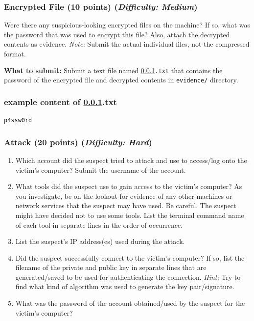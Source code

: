 \documentclass[letterpaper,12pt]{report}
\begin{document}
\subsubsection{Encrypted File (10 points)    \hfill\rm\normalsize (\emph{Difficulty: Medium})}
\label{sec:encrypted_file}
Were there any suspicious-looking encrypted files on the machine? If so, what was the password that was used to encrypt this file? Also, attach the decrypted contents as evidence. \textit{Note:} Submit the actual individual files, not the compressed format.

\medskip 
\textbf{What to submit:} Submit a text file named \texttt{\ref{sec:encrypted_file}.txt} that contains the password of the encrypted file and decrypted contents in \texttt{evidence/} directory.

\subsubsection*{example content of {\ref{sec:encrypted_file}.txt}}
\begin{mdframed}
\begin{Verbatim}
p4ssw0rd
\end{Verbatim}
\end{mdframed}

\subsubsection{Attack (20 points)    \hfill\rm\normalsize (\emph{Difficulty: Hard})}
\label{sec:attack_suspect}

\begin{enumerate}
\item Which account did the suspect tried to attack and use to access/log onto the victim's computer? Submit the username of the account.
\item What tools did the suspect use to gain access to the victim's computer? As you investigate, be on the lookout for evidence of any other machines or network services that the suspect may have used. Be careful. The suspect might have decided not to use some tools. List the terminal command name of each tool in separate lines in the order of occurrence.
\item List the suspect's IP address(es) used during the attack.
\item Did the suspect successfully connect to the victim's computer? If so, list the filename of the private and public key in separate lines that are generated/saved to be used for authenticating the connection. \textit{Hint:} Try to find what kind of algorithm was used to generate the key pair/signature.
\item What was the password of the account obtained/used by the suspect for the victim's computer?
\end{enumerate}
\end{document}
